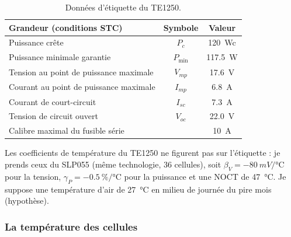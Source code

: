 \begin{table}[H]
\centering
\small
\begin{tabular}{|l|c|c|}
\hline
\textbf{Grandeur (conditions STC)} & \textbf{Symbole} & \textbf{Valeur} \\
\hline
Puissance crête & $P_c$ & \qty{120}{Wc} \\
\hline
Puissance minimale garantie & $P_{\min}$ & \qty{117,5}{W} \\
\hline
Tension au point de puissance maximale & $V_{mp}$ & \qty{17,6}{V} \\
\hline
Courant au point de puissance maximale & $I_{mp}$ & \qty{6,8}{A} \\
\hline
Courant de court-circuit & $I_{sc}$ & \qty{7,3}{A} \\
\hline
Tension de circuit ouvert & $V_{oc}$ & \qty{22,0}{V} \\
\hline
Calibre maximal du fusible série & & \qty{10}{A} \\
\hline
\end{tabular}
\caption{Données d'étiquette du TE1250.}
\end{table}

Les coefficients de température du TE1250 ne figurent pas sur l'étiquette : je prends ceux du SLP055 (même technologie, 36 cellules), soit $\beta_V = -\qty{80}{mV/\celsius}$ pour la tension, $\gamma_P = -\qty{0,5}{\percent/\celsius}$ pour la puissance et une NOCT de \qty{47}{\celsius}. Je suppose une température d'air de \qty{27}{\celsius} en milieu de journée du pire mois (hypothèse).

\subsubsection*{La température des cellules}

